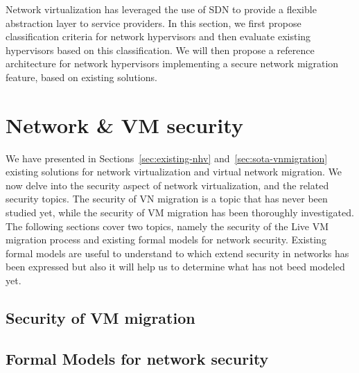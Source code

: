 \documentclass[a4paper, 11pt]{report}
\theoremstyle{definition}
\begin{document}
Network virtualization has leveraged the use of SDN to provide a flexible abstraction layer to service providers. In this section, we first propose classification criteria for network hypervisors and then evaluate existing hypervisors based on this classification. We will then propose a reference architecture for network hypervisors implementing a secure network migration feature, based on existing solutions.















\section{Network \& VM security}

We have presented in Sections~\ref{sec:existing-nhv} and~\ref{sec:sota-vnmigration} existing solutions for network virtualization and virtual network migration. We now delve into the security aspect of network virtualization, and the related security topics. The security of VN migration is a topic that has never been  studied yet, while the security of VM migration has been thoroughly investigated. The following sections cover two topics, namely the security of the Live VM migration process and existing formal models for network security.
Existing formal models are useful to understand to which extend security in networks has been expressed but also it will help us to determine what has not beed modeled yet.

\subsection{Security of VM migration}



\subsection{Formal Models for network security}
\end{document}
